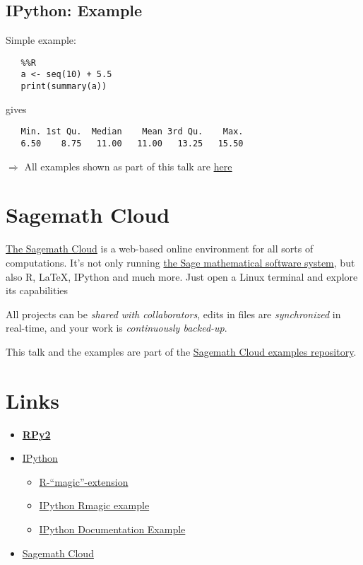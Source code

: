 \documentclass[
paper=128mm:96mm, %
fontsize=11pt, %
pagesize, %
parskip=half-, %
]{scrartcl} %
\newcommand*{\mygreen}[1]{\textcolor{mygreen}{#1}}
\theoremstyle{mythmstyle} %
\def\shorttitle{R meets Python}
\newcommand*{\runninghead}{\shorttitle} %
\newcommand*{\newhead}[1]{\renewcommand*{\runninghead}{\shorttitle: #1}}
\begin{document}
\clearpage
\newhead{IPython: Example}
\subsection{IPython: Example}

Simple example:
\begin{verbatim}
   %%R
   a <- seq(10) + 5.5
   print(summary(a))
\end{verbatim}
gives
\begin{verbatim}
   Min. 1st Qu.  Median    Mean 3rd Qu.    Max.
   6.50    8.75   11.00   11.00   13.25   15.50
\end{verbatim}

\mygreen{$\Rightarrow{}$ All examples shown as part of this talk are
\href{http://nbviewer.ipython.org/urls/github.com/sagemath/cloud-examples/raw/master/r/rmagic.ipynb}{\uline{here}}}

\clearpage
\newhead{Sagemath Cloud}
\section{Sagemath Cloud}

\href{https://cloud.sagemath.org}{The Sagemath Cloud} is a web-based online
environment for all sorts of computations.
It's not only running
\href{http://www.sagemath.org}{the Sage mathematical software system},
but also R, LaTeX, IPython and much more.
Just open a Linux terminal and explore its capabilities \smiley

All projects can be \textit{shared with collaborators},
edits in files are \textit{synchronized} in real-time,
and your work is \textit{continuously backed-up}.

This talk and the examples are part of the
\href{https://github.com/sagemath/cloud-examples}{Sagemath Cloud examples repository}.

\clearpage
\newhead{Links}
\section{Links}

\begin{itemize}
\item \href{http://rpy.sourceforge.net/rpy2.html}{\textbf{RPy2}}
\item \href{http://www.ipython.org}{IPython}
\begin{itemize}
\item \href{http://ipython.org/ipython-doc/dev/config/extensions/rmagic.html}{R-``magic''-extension}
\item \href{http://nbviewer.ipython.org/urls/github.com/sagemath/cloud-examples/raw/master/r/rmagic.ipynb}{IPython Rmagic example}
\item \href{http://nbviewer.ipython.org/urls/github.com/ipython/ipython/raw/master/examples/notebooks/R Magics.ipynb}{IPython Documentation Example}
\end{itemize}
\item \href{https://cloud.sagemath.org}{Sagemath Cloud}
\end{itemize}
\end{document}
